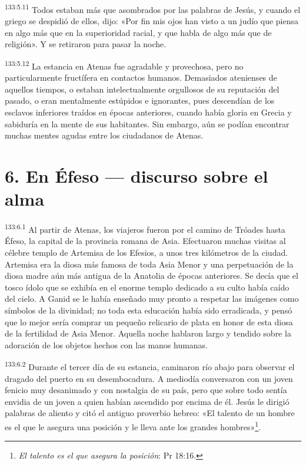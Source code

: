 \par 
\textsuperscript{133:5.11} Todos estaban más que asombrados por las palabras de Jesús, y cuando el griego se despidió de ellos, dijo: «Por fin mis ojos han visto a un judío que piensa en algo más que en la superioridad racial, y que habla de algo más que de religión». Y se retiraron para pasar la noche.

\par 
\textsuperscript{133:5.12} La estancia en Atenas fue agradable y provechosa, pero no particularmente fructífera en contactos humanos. Demasiados atenienses de aquellos tiempos, o estaban intelectualmente orgullosos de su reputación del pasado, o eran mentalmente estúpidos e ignorantes, pues descendían de los esclavos inferiores traídos en épocas anteriores, cuando había gloria en Grecia y sabiduría en la mente de sus habitantes. Sin embargo, aún se podían encontrar muchas mentes agudas entre los ciudadanos de Atenas.

\section*{6. En Éfeso --- discurso sobre el alma}
\par 
\textsuperscript{133:6.1} Al partir de Atenas, los viajeros fueron por el camino de Tróades hasta Éfeso, la capital de la provincia romana de Asia. Efectuaron muchas visitas al célebre templo de Artemisa de los Efesios, a unos tres kilómetros de la ciudad. Artemisa era la diosa más famosa de toda Asia Menor y una perpetuación de la diosa madre aún más antigua de la Anatolia de épocas anteriores. Se decía que el tosco ídolo que se exhibía en el enorme templo dedicado a su culto había caído del cielo. A Ganid se le había enseñado muy pronto a respetar las imágenes como símbolos de la divinidad; no toda esta educación había sido erradicada, y pensó que lo mejor sería comprar un pequeño relicario de plata en honor de esta diosa de la fertilidad de Asia Menor. Aquella noche hablaron largo y tendido sobre la adoración de los objetos hechos con las manos humanas.

\par 
\textsuperscript{133:6.2} Durante el tercer día de su estancia, caminaron río abajo para observar el dragado del puerto en su desembocadura. A mediodía conversaron con un joven fenicio muy desanimado y con nostalgia de su país, pero que sobre todo sentía envidia de un joven a quien habían ascendido por encima de él. Jesús le dirigió palabras de aliento y citó el antiguo proverbio hebreo: «El talento de un hombre es el que le asegura una posición y le lleva ante los grandes hombres»\footnote{\textit{El talento es el que asegura la posición}: Pr 18:16.}.

